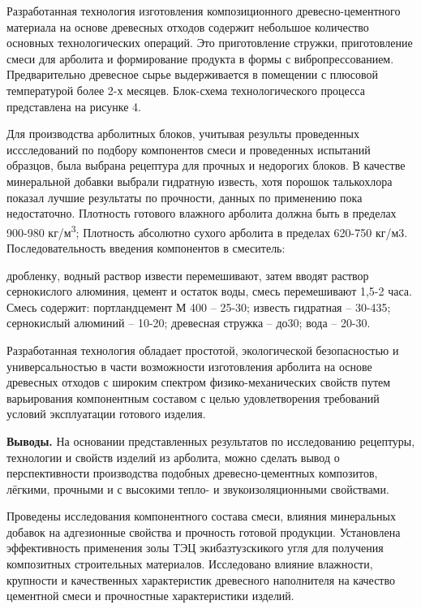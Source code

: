 \begin{multicols}{2}
Разработанная технология изготовления композиционного
древесно-цементного материала на основе древесных отходов содержит
небольшое количество основных технологических операций. Это
приготовление стружки, приготовление смеси для арболита и формирование
продукта в формы с вибропрессованием. Предварительно древесное сырье
выдерживается в помещении с плюсовой температурой более 2-х месяцев.
Блок-схема технологического процесса представлена на рисунке 4.

Для производства арболитных блоков, учитывая результы проведенных
иссследований по подбору компонентов смеси и проведенных испытаний
образцов, была выбрана рецептура для прочных и недорогих блоков. В
качестве минеральной добавки выбрали гидратную известь, хотя порошок
талькохлора показал лучшие результаты по прочности, данных по применению
пока недостаточно. Плотность готового влажного арболита должна быть в
пределах 900-980 кг/м\textsuperscript{3}; Плотность абсолютно сухого
арболита в пределах 620-750 кг/м3. Последовательность введения
компонентов в смеситель:

дробленку, водный раствор извести перемешивают, затем вводят раствор
сернокислого алюминия, цемент и остаток воды, смесь перемешивают 1,5-2
часа. Смесь содержит: портландцемент М 400 -- 25-30; известь гидратная
-- 30-435; сернокислый алюминий -- 10-20; древесная стружка -- до30;
вода -- 20-30.

Разработанная технология обладает простотой, экологической безопасностью
и универсальностью в части возможности изготовления арболита на основе
древесных отходов с широким спектром физико-механических свойств путем
варьирования компонентным составом с целью удовлетворения требований
условий эксплуатации готового изделия.

{\bfseries Выводы.} На основании представленных результатов по исследованию
рецептуры, технологии и свойств изделий из арболита, можно сделать вывод
о перспективности производства подобных древесно-цементных композитов,
лёгкими, прочными и с высокими тепло- и звукоизоляционными свойствами.

Проведены исследования компонентного состава смеси, влияния минеральных
добавок на адгезионные свойства и прочность готовой продукции.
Установлена эффективность применения золы ТЭЦ экибазтузскикого угля для
получения композитных строительных материалов. Исследовано влияние
влажности, крупности и качественных характеристик древесного наполнителя
на качество цементной смеси и прочностные характеристики изделий.


\end{multicols}
